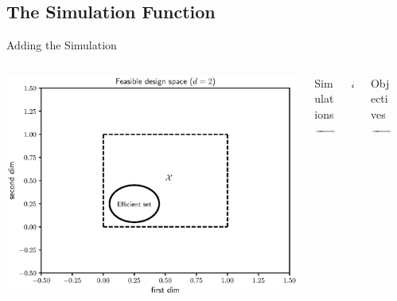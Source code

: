 \documentclass[aspectratio=169]{beamer}
\begin{document}
\subsection{The Simulation Function}
\begin{frame}{Adding the Simulation}
\begin{columns}
\begin{column}{.35\textwidth}
\includegraphics[width=\textwidth]{feasible_design.eps}\\
\end{column}
\begin{column}{.11\textwidth}
\begin{center}
{\scriptsize
Simulations\\
}
$\xrightarrow{\hspace*{1.5cm}}$
\end{center}
\end{column}
\begin{column}{.08\textwidth}
\begin{center}
{\Huge $\mathcal{S}$}
\end{center}
\end{column}
\begin{column}{.11\textwidth}
\begin{center}
{\scriptsize
Objectives\\
}
$\xrightarrow{\hspace*{1.5cm}}$
\end{center}
\end{column}
\begin{column}{.35\textwidth}

\end{column}
\end{columns}
\end{frame}
\end{document}
